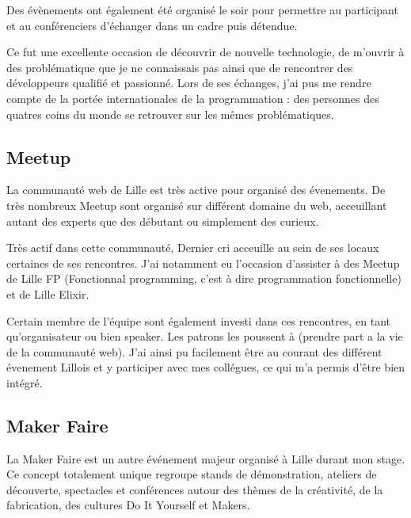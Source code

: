\documentclass[12pt,a4paper]{article}
\begin{document}
  \bigskip

  Des évènements ont également été organisé le soir pour permettre au
  participant et au conférenciers d'échanger dans un cadre puis détendue.

  \bigskip

  Ce fut une excellente occasion de découvrir de nouvelle technologie, de
  m'ouvrir à des problématique que je ne connaissais pas ainsi que de
  rencontrer des développeurs qualifié et passionné. Lors de ses échanges,
  j'ai pus me rendre compte de la portée internationales de la
  programmation : des personnes des quatres coins du monde se retrouver
  sur les mêmes problématiques.

  \bigskip

  \subsection{Meetup}\label{meetup}

  \bigskip

  La communauté web de Lille est très active pour organisé des évenements.
  De très nombreux Meetup sont organisé sur différent domaine du web,
  acceuillant autant des experts que des débutant ou simplement des
  curieux.

  \bigskip

  Très actif dans cette communauté, Dernier cri acceuille au sein de ses
  locaux certaines de ses rencontres. J'ai notamment eu l'occasion
  d'assister à des Meetup de Lille FP (Fonctionnal programming, c'est à
  dire programmation fonctionnelle) et de Lille Elixir.

  \bigskip

  Certain membre de l'équipe sont également investi dans ces rencontres,
  en tant qu'organisateur ou bien speaker. Les patrons les poussent à
  (prendre part a la vie de la communauté web). J'ai ainsi pu facilement
  être au courant des différent évenement Lillois et y participer avec mes
  collégues, ce qui m'a permis d'être bien intégré.

  \bigskip

  \subsection{Maker Faire}\label{maker-faire}

  \bigskip

  La Maker Faire est un autre événement majeur organisé à Lille durant mon
  stage. Ce concept totalement unique regroupe stands de démonstration,
  ateliers de découverte, spectacles et conférences autour des thèmes de
  la créativité, de la fabrication, des cultures Do It Yourself et Makers.
\end{document}
